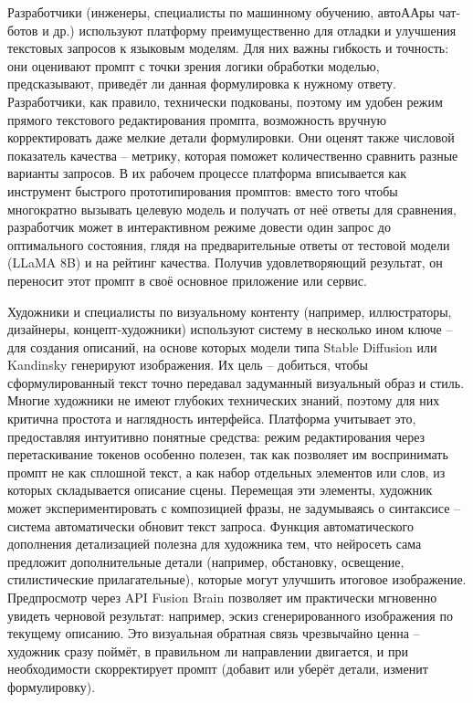 Разработчики (инженеры, специалисты по машинному обучению, автоААры чат-ботов и др.) используют платформу преимущественно для отладки и улучшения текстовых запросов к языковым моделям. Для них важны гибкость и точность: они оценивают промпт с точки зрения логики обработки моделью, предсказывают, приведёт ли данная формулировка к нужному ответу. Разработчики, как правило, технически подкованы, поэтому им удобен режим прямого текстового редактирования промпта, возможность вручную корректировать даже мелкие детали формулировки. Они оценят также числовой показатель качества – метрику, которая поможет количественно сравнить разные варианты запросов. В их рабочем процессе платформа вписывается как инструмент быстрого прототипирования промптов: вместо того чтобы многократно вызывать целевую модель и получать от неё ответы для сравнения, разработчик может в интерактивном режиме довести один запрос до оптимального состояния, глядя на предварительные ответы от тестовой модели (LLaMA 8B) и на рейтинг качества. Получив удовлетворяющий результат, он переносит этот промпт в своё основное приложение или сервис.

Художники и специалисты по визуальному контенту (например, иллюстраторы, дизайнеры, концепт-художники) используют систему в несколько ином ключе – для создания описаний, на основе которых модели типа Stable Diffusion или Kandinsky генерируют изображения. Их цель – добиться, чтобы сформулированный текст точно передавал задуманный визуальный образ и стиль. Многие художники не имеют глубоких технических знаний, поэтому для них критична простота и наглядность интерфейса. Платформа учитывает это, предоставляя интуитивно понятные средства: режим редактирования через перетаскивание токенов особенно полезен, так как позволяет им воспринимать промпт не как сплошной текст, а как набор отдельных элементов или слов, из которых складывается описание сцены. Перемещая эти элементы, художник может экспериментировать с композицией фразы, не задумываясь о синтаксисе – система автоматически обновит текст запроса. Функция автоматического дополнения детализацией полезна для художника тем, что нейросеть сама предложит дополнительные детали (например, обстановку, освещение, стилистические прилагательные), которые могут улучшить итоговое изображение. Предпросмотр через API Fusion Brain позволяет им практически мгновенно увидеть черновой результат: например, эскиз сгенерированного изображения по текущему описанию. Это визуальная обратная связь чрезвычайно ценна – художник сразу поймёт, в правильном ли направлении двигается, и при необходимости скорректирует промпт (добавит или уберёт детали, изменит формулировку).

